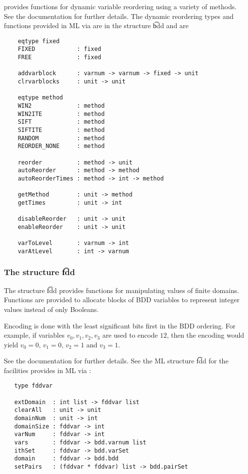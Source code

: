 \Buddy{} provides functions for dynamic variable reordering using a variety of methods.
See the \Buddy{} documentation \cite{BuDDy} for further details. The dynamic reordering
types and functions provided in ML via \Muddy{} are in the structure \t{bdd} and are

{\footnotesize\begin{verbatim}
    eqtype fixed
    FIXED            : fixed
    FREE             : fixed

    addvarblock      : varnum -> varnum -> fixed -> unit
    clrvarblocks     : unit -> unit

    eqtype method
    WIN2             : method
    WIN2ITE          : method
    SIFT             : method
    SIFTITE          : method
    RANDOM           : method
    REORDER_NONE     : method

    reorder          : method -> unit
    autoReorder      : method -> method
    autoReorderTimes : method -> int -> method

    getMethod        : unit -> method
    getTimes         : unit -> int

    disableReorder   : unit -> unit
    enableReorder    : unit -> unit

    varToLevel       : varnum -> int
    varAtLevel       : int -> varnum
\end{verbatim}}

\subsubsection{The \Muddy{} structure \t{fdd}}\label{fdd}

The structure \t{fdd} provides functions for manipulating values of finite domains.
Functions are provided to allocate blocks of BDD variables to represent integer values instead
of only Booleans.

Encoding is done with the least significant bits first in the BDD ordering. For example, if variables
$v_0, v_1, v_2, v_3$ are used to encode $12$, then the encoding would yield
$v_0=0$, $v_1=0$, $v_2=1$ and $v_3=1$.

See the \Buddy{} documentation \cite{BuDDy} for further details. See the ML structure \t{fdd}
for the \Buddy{} facilities provides in ML via \Muddy:

{\footnotesize\begin{verbatim}
   type fddvar

   extDomain  : int list -> fddvar list
   clearAll   : unit -> unit
   domainNum  : unit -> int
   domainSize : fddvar -> int
   varNum     : fddvar -> int
   vars       : fddvar -> bdd.varnum list
   ithSet     : fddvar -> bdd.varSet
   domain     : fddvar -> bdd.bdd
   setPairs   : (fddvar * fddvar) list -> bdd.pairSet
\end{verbatim}}

